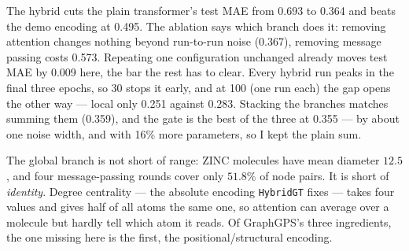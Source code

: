 The hybrid cuts the plain transformer's test MAE from 0.693 to 0.364 and beats the
demo encoding at 0.495. The ablation says which branch does it: removing attention
changes nothing beyond run-to-run noise (0.367), removing message passing costs
0.573. Repeating one configuration unchanged already moves test MAE by 0.009 here,
the bar the rest has to clear. Every hybrid run peaks in the final three epochs, so 30 stops
it early, and at 100 (one run each) the gap opens the other way --- local only 0.251 against 0.283. Stacking the branches matches summing them (0.359), and the gate is
the best of the three at 0.355 --- by about one noise width, and with 16\% more
parameters, so I kept the plain sum.

The global branch is not short of range: ZINC molecules have mean diameter $12.5$, and four
message-passing rounds cover only $51.8\%$ of node pairs. It is short of \emph{identity}.
Degree centrality --- the absolute encoding \texttt{HybridGT} fixes --- takes four values and
gives half of all atoms the same one, so attention can average over a molecule but hardly
tell which atom it reads. Of GraphGPS's three ingredients, the one missing here is the first,
the positional/structural encoding.

